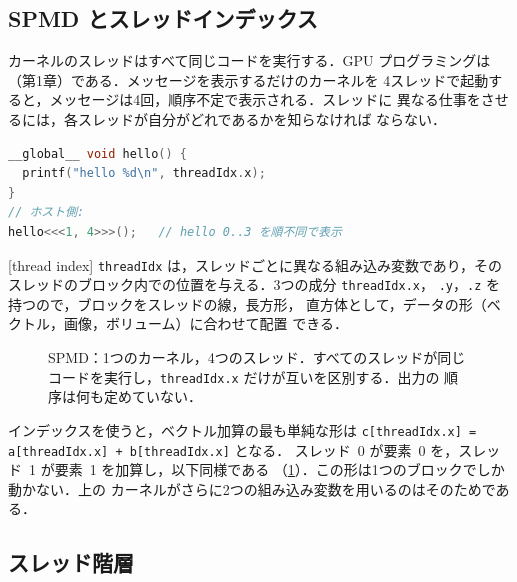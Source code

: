 \documentclass[../main.tex]{subfiles}
\begin{document}
\subsection{SPMD とスレッドインデックス}

カーネルのスレッドはすべて同じコードを実行する．GPU プログラミングは
（第1章）である．メッセージを表示するだけのカーネルを
4スレッドで起動すると，メッセージは4回，順序不定で表示される．スレッドに
異なる仕事をさせるには，各スレッドが自分がどれであるかを知らなければ
ならない．
\begin{lstlisting}[language=C++, numbers=none]
__global__ void hello() {
  printf("hello %d\n", threadIdx.x);
}
// ホスト側:
hello<<<1, 4>>>();   // hello 0..3 を順不同で表示
\end{lstlisting}

\begin{definition}[スレッドインデックス]
  [thread index]
  \texttt{threadIdx} は，スレッドごとに異なる組み込み変数であり，その
  スレッドのブロック内での位置を与える．3つの成分 \texttt{threadIdx.x}，
  \texttt{.y}，\texttt{.z} を持つので，ブロックをスレッドの線，長方形，
  直方体として，データの形（ベクトル，画像，ボリューム）に合わせて配置
  できる．
\end{definition}

\begin{figure}[tb]
  \centering
  
  \caption{SPMD：1つのカーネル，4つのスレッド．すべてのスレッドが同じ
    コードを実行し，\texttt{threadIdx.x} だけが互いを区別する．出力の
    順序は何も定めていない．}
  \label{fig:l03-spmd}
\end{figure}

インデックスを使うと，ベクトル加算の最も単純な形は
\texttt{c[threadIdx.x] = a[threadIdx.x] + b[threadIdx.x]} となる．
スレッド~0 が要素~0 を，スレッド~1 が要素~1 を加算し，以下同様である
（\cref{fig:l03-spmd}）．この形は1つのブロックでしか動かない．上の
カーネルがさらに2つの組み込み変数を用いるのはそのためである．

\subsection{スレッド階層}
\end{document}
